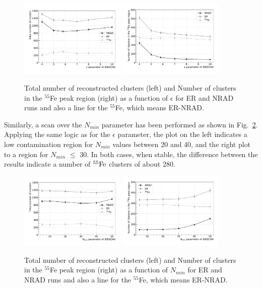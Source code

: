 \documentclass[a4paper,11pt]{article}
\begin{document}
\begin{figure}[ht]
\centering
\includegraphics[width=0.45\textwidth]{TotalEpsScan.pdf}
\includegraphics[width=0.45\textwidth]{SpotEpsScan.pdf}
\caption{Total number of reconstructed clusters (left) and Number of clusters in the $^{55}$Fe peak region (right) as a function of $\epsilon$ for ER and NRAD runs and also a line for the $^{55}$Fe, which means ER-NRAD.}
\label{fig:epsscan}
\end{figure}


Similarly, a scan over the $N_{min}$ parameter has been performed as shown in Fig.~\ref{fig:minscan}. Applying the same logic as for the $\epsilon$ parameter, the plot on the left indicates a low contamination region for $N_{min}$ values between 20 and 40, and the right plot to a region for $N_{min}$ $\leq$ 30. In both cases, when stable, the difference between the results indicate a number of $\rm ^{55}Fe$ clusters of about 280. %


\begin{figure}[ht]
\centering
\includegraphics[width=0.45\textwidth]{TotalMinScan.pdf}
\includegraphics[width=0.45\textwidth]{SpotMinScan.pdf}
\caption{Total number of reconstructed clusters (left) and Number of clusters in the $^{55}$Fe peak region (right) as a function of $N_{min}$ for ER and NRAD runs and also a line for the $^{55}$Fe, which means ER-NRAD.}
\label{fig:minscan}
\end{figure}
\end{document}
